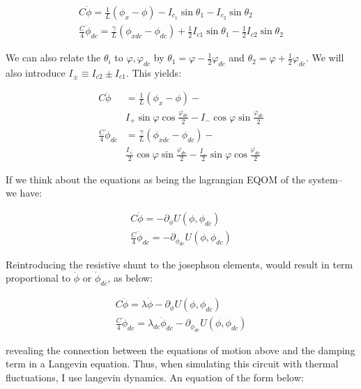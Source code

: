 \documentclass[paper=a4, twocolumn, fontsize=10pt]{article} %
\numberwithin{equation}{section} %
\numberwithin{figure}{section} %
\numberwithin{table}{section} %
\begin{document}
\begin{align}
    C \ddot{\phi} = \frac{1}{L}\left( \phi_x - \phi \right) - I_{c_1} \sin \theta_1 - I_{c_2} \sin \theta_2
    \\
    \frac{C}{4} \ddot{\phi}_{dc}= \frac{\gamma}{L}\left( \phi_{xdc} -\phi_{dc}\right) +\frac{1}{2}I_{c1} \sin\theta_1 - \frac{1}{2} I_{c2} \sin \theta_2
    \end{align}



We can also relate the $\theta_i$ to $\varphi,\varphi_{dc}$ by $\theta_1 = \varphi - \frac{1}{2}\varphi_{dc} $ and $\theta_2 = \varphi + \frac{1}{2}\varphi_{dc} $. We will also introduce $I_{\pm} \equiv I_{c2} \pm I_{c1}$.  This yields:

\begin{align}
    C \ddot{\phi} &= \frac{1}{L}\left( \phi_x - \phi \right) - 
    \\
    &I_{+} \sin \varphi \cos \frac{\varphi_{dc}}{2} - I_{-} \cos \varphi \sin \frac{\varphi_{dc}}{2}
    \\
    \frac{C}{4} \ddot{\phi}_{dc} &= \frac{\gamma}{L}\left( \phi_{xdc} -\phi_{dc}\right) - 
    \\
    &\frac{I_{+}}{2} \cos \varphi \sin \frac{\varphi_{dc}}{2} - \frac{I_{-}}{2} \sin \varphi \cos \frac{\varphi_{dc}}{2}
\end{align}

If we think about the equations as being the lagrangian EQOM of the system-- we have:

\begin{align}
    C \ddot{\phi} = - \partial_\phi U(\phi, \phi_{dc})
    \\
    \frac{C}{4} \ddot{\phi}_{dc} = - \partial_{\phi_{dc}} U(\phi, \phi_{dc})
    \end{align}


Reintroducing the resistive shunt to the josephson elements, would result in term proportional to $\dot{\phi}$ or $\dot{\phi}_{dc}$, as below:

\begin{align}
C \ddot{\phi} = \lambda \dot{\phi} - \partial_\phi U(\phi, \phi_{dc})
\\
\frac{C}{4} \ddot{\phi}_{dc} = \lambda_{dc} \dot{\phi}_{dc} - \partial_{\phi_{dc}} U(\phi, \phi_{dc})
\end{align}

revealing the connection between the equations of motion above and the damping term in a Langevin equation. Thus, when simulating this circuit with thermal fluctuations, I use langevin dynamics. An equation of the form below:
\end{document}

